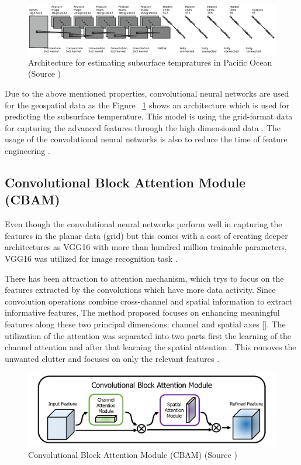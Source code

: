 \begin{figure}[h]
    \centering
    \includegraphics[width=1.0\linewidth]{figures/chapter-4/han3-2955957-large.png}
    \caption{Architecture for estimating subsurface tempratures in Pacific Ocean (Source \cite{8913542}) }
    \label{fig:architecture-pacific-ocean}
\end{figure}

Due to the above mentioned properties, convolutional neural networks are used for the geospatial data as the Figure ~\ref{fig:architecture-pacific-ocean} shows an architecture which is used for predicting the subsurface temperature.
This model is using the grid-format data for capturing the advanced features through the high dimensional data \cite{8913542}. The usage of the convolutional neural networks is also to reduce the time of feature engineering \cite{8913542}.


\subsection{Convolutional Block Attention Module (CBAM)}
Even though the convolutional neural networks perform well in capturing the features in the planar data (grid) but this comes with a cost of creating deeper architectures as VGG16\cite{simonyan2015deep} with more than hundred million trainable parameters, VGG16 was utilized for image recognition task \cite{simonyan2015deep}.

There has been attraction to attention mechanism, which trys to focus on the features extracted by the convolutions which have more data activity.
Since convolution operations combine cross-channel and spatial information to extract informative features, The method proposed \cite{woo2018cbam} focuses on enhancing meaningful features along these two principal dimensions: channel and spatial axes [\cite{woo2018cbam}].
The utilization of the attention was separated into two parts first the learning of the channel attention and after that learning the spatial attention \cite{woo2018cbam}. This removes the unwanted clutter and focuses on only the relevant features \cite{woo2018cbam}.

\begin{figure}[h]
    \centering
    \includegraphics[width=1.0\linewidth]{figures/chapter-4/CBAM.png}
    \caption{Convolutional Block Attention Module (CBAM) (Source \cite{woo2018cbam}) }
    \label{fig:cbam-image}
\end{figure}

